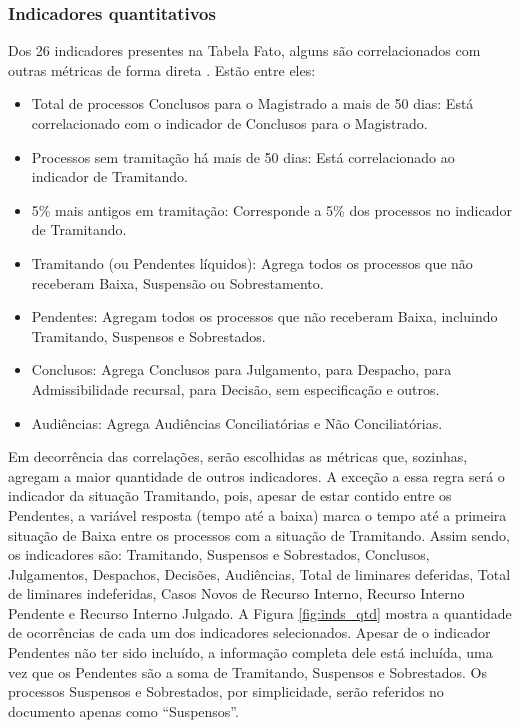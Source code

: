 \subsubsection{Indicadores quantitativos}
Dos 26 indicadores presentes na Tabela Fato, alguns são correlacionados com outras métricas de forma direta \cite{painelestatistica}. Estão entre eles:
\begin{itemize}
    \item Total de processos Conclusos para o Magistrado a mais de 50 dias: Está correlacionado com o indicador de Conclusos para o Magistrado.
    \item Processos sem tramitação há mais de 50 dias: Está correlacionado ao indicador de Tramitando.
    \item 5\% mais antigos em tramitação: Corresponde a 5\% dos processos no indicador de Tramitando.
    \item Tramitando (ou Pendentes líquidos): Agrega todos os processos que não receberam Baixa, Suspensão ou Sobrestamento.
    \item Pendentes: Agregam todos os processos que não receberam Baixa, incluindo Tramitando, Suspensos e Sobrestados.
    \item Conclusos: Agrega Conclusos para Julgamento, para Despacho, para Admissibilidade recursal, para Decisão, sem especificação e outros.
    \item Audiências: Agrega Audiências Conciliatórias e Não Conciliatórias.
\end{itemize}


Em decorrência das correlações, serão escolhidas as métricas que, sozinhas, agregam a maior quantidade de outros indicadores. A exceção a essa regra será o indicador da situação Tramitando, pois, apesar de estar contido entre os Pendentes, a variável resposta (tempo até a baixa) marca o tempo até a primeira situação de Baixa entre os processos com a situação de Tramitando. Assim sendo, os indicadores são: Tramitando, Suspensos e Sobrestados, Conclusos, Julgamentos, Despachos, Decisões, Audiências, Total de liminares deferidas, Total de liminares indeferidas, Casos Novos de Recurso Interno, Recurso Interno Pendente e Recurso Interno Julgado. A Figura \ref{fig:inds_qtd} mostra a quantidade de ocorrências de cada um dos indicadores selecionados. Apesar de o indicador Pendentes não ter sido incluído, a informação completa dele está incluída, uma vez que os Pendentes são a soma de Tramitando, Suspensos e Sobrestados. Os processos Suspensos e Sobrestados, por simplicidade, serão referidos no documento apenas como “Suspensos”.

